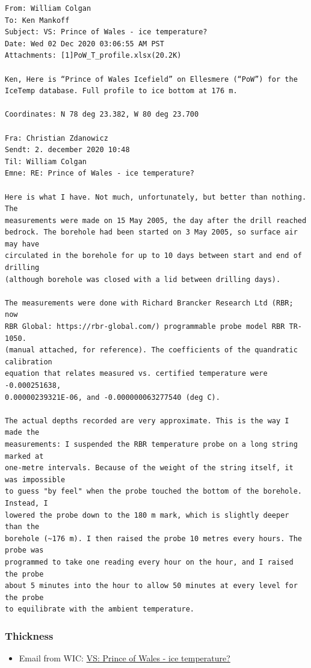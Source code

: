 \documentclass[article,a4paper,times,11pt,twoside]{article}
\begin{document}
\begin{verbatim}
From: William Colgan
To: Ken Mankoff
Subject: VS: Prince of Wales - ice temperature?
Date: Wed 02 Dec 2020 03:06:55 AM PST
Attachments: [1]PoW_T_profile.xlsx(20.2K)

Ken, Here is “Prince of Wales Icefield” on Ellesmere (“PoW”) for the IceTemp database. Full profile to ice bottom at 176 m.

Coordinates: N 78 deg 23.382, W 80 deg 23.700

Fra: Christian Zdanowicz
Sendt: 2. december 2020 10:48
Til: William Colgan
Emne: RE: Prince of Wales - ice temperature?

Here is what I have. Not much, unfortunately, but better than nothing. The
measurements were made on 15 May 2005, the day after the drill reached
bedrock. The borehole had been started on 3 May 2005, so surface air may have
circulated in the borehole for up to 10 days between start and end of drilling
(although borehole was closed with a lid between drilling days).

The measurements were done with Richard Brancker Research Ltd (RBR; now
RBR Global: https://rbr-global.com/) programmable probe model RBR TR-1050.
(manual attached, for reference). The coefficients of the quandratic calibration
equation that relates measured vs. certified temperature were -0.000251638,
0.00000239321E-06, and -0.000000063277540 (deg C).

The actual depths recorded are very approximate. This is the way I made the
measurements: I suspended the RBR temperature probe on a long string marked at
one-metre intervals. Because of the weight of the string itself, it was impossible
to guess "by feel" when the probe touched the bottom of the borehole. Instead, I
lowered the probe down to the 180 m mark, which is slightly deeper than the
borehole (~176 m). I then raised the probe 10 metres every hours. The probe was
programmed to take one reading every hour on the hour, and I raised the probe
about 5 minutes into the hour to allow 50 minutes at every level for the probe
to equilibrate with the ambient temperature.
\end{verbatim}


\subsubsection{Thickness}
\label{sec:org66f17e0}

\begin{itemize}
\item Email from WIC: \href{msgid:AM0PR04MB61293648564AB69ACA6A02CBA2F30@AM0PR04MB6129.eurprd04.prod.outlook.com}{VS: Prince of Wales - ice temperature?}
\end{itemize}
\end{document}

